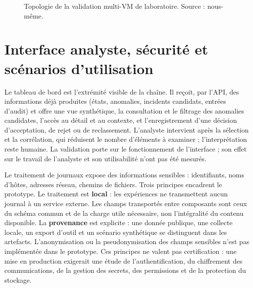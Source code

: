 \begin{figure}[H]
\centering
{}
\caption{Topologie de la validation multi-VM de laboratoire. Source : nous-même.}
\label{fig:topologie-multivm}
\end{figure}

\section{Interface analyste, sécurité et scénarios d'utilisation}

\label{sec:interface-scenarios}

Le tableau de bord est l'extrémité visible de la chaîne. Il reçoit, par l'API, des informations déjà produites (états, anomalies, incidents candidats, entrées d'audit) et offre une vue synthétique, la consultation et le filtrage des anomalies candidates, l'accès au détail et au contexte, et l'enregistrement d'une décision d'acceptation, de rejet ou de reclassement. L'analyste intervient après la sélection et la corrélation, qui réduisent le nombre d'éléments à examiner ; l'interprétation reste humaine. La validation porte sur le fonctionnement de l'interface ; son effet sur le travail de l'analyste et son utilisabilité n'ont pas été mesurés.

Le traitement de journaux expose des informations sensibles : identifiants, noms d'hôtes, adresses réseau, chemins de fichiers. Trois principes encadrent le prototype. Le traitement est \textbf{local} : les expériences ne transmettent aucun journal à un service externe. Les champs transportés entre composants sont ceux du schéma commun et de la charge utile nécessaire, non l'intégralité du contenu disponible. La \textbf{provenance} est explicite : une donnée publique, une collecte locale, un export d'outil et un scénario synthétique se distinguent dans les artefacts. L'anonymisation ou la pseudonymisation des champs sensibles n'est pas implémentée dans le prototype. Ces principes ne valent pas certification : une mise en production exigerait une étude de l'authentification, du chiffrement des communications, de la gestion des secrets, des permissions et de la protection du stockage.

